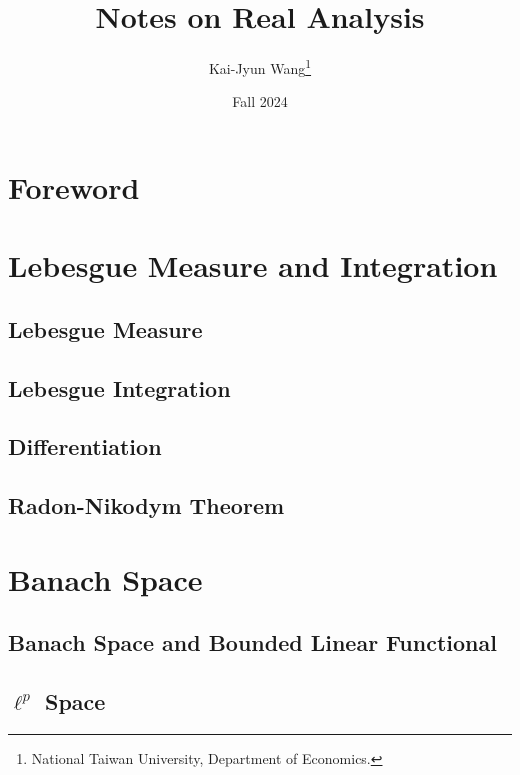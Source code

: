 \documentclass[a4paper, 12pt]{article}
\title{Notes on Real Analysis}
\author{Kai-Jyun Wang\thanks{National Taiwan University, Department of Economics.}}
\date{Fall 2024}
\begin{document}
 
\maketitle

\section*{Foreword}


\newpage
\tableofcontents
\newpage

\section{Lebesgue Measure and Integration}

\subsection{Lebesgue Measure}


\subsection{Lebesgue Integration}


\subsection{Differentiation}


\subsection{Radon-Nikodym Theorem}


\newpage

\section{Banach Space}

\subsection{Banach Space and Bounded Linear Functional}


\subsection{$\ell^p$ Space}

\end{document}
